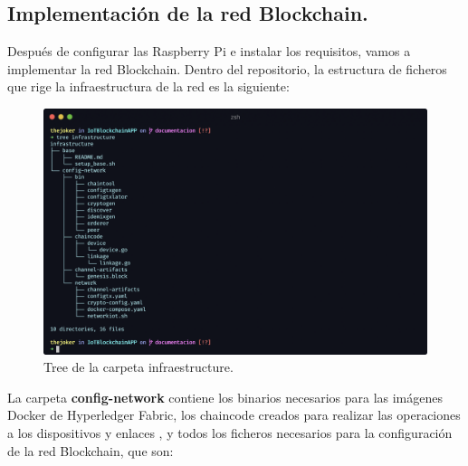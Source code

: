 \newpage

\subsection{Implementación de la red Blockchain.}

Después de configurar las Raspberry Pi e instalar los requisitos, vamos a implementar la red Blockchain.
Dentro del repositorio, la estructura de ficheros que rige la infraestructura de la red es la siguiente:

\begin{figure}[ht!]
  \centering
  \includegraphics[width=\textwidth]{imagenes/desarrollo/tree_infraestructure}
  \caption{Tree de la carpeta infraestructure.}
  \label{fig:tree-infraestructure}
\end{figure}

\vspace{5mm}

\noindent La carpeta \textbf{config-network} contiene los binarios necesarios para las imágenes Docker de Hyperledger 
Fabric, los chaincode creados para realizar las operaciones a los dispositivos y enlaces 
\cite{developing-chaincode-nodejs}, y todos los ficheros necesarios para la configuración de la red Blockchain, que son: 

